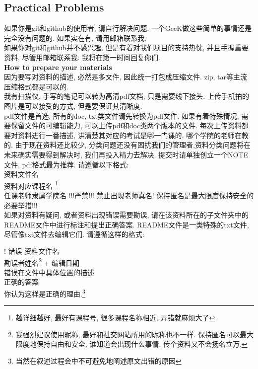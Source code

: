 \documentclass{article}
\begin{document}
\begin{spacing}{1.5}
\subsection{Practical Problems}
如果你是git和github的使用者, 请自行解决问题. 一个GeeK做这些简单的事情还是完全没有问题的. 如果实在有, 请用邮箱联系我.\\
如果你对git和github并不感兴趣, 但是有着对我们项目的支持热忱, 并且手握重要资料, 尽管用邮箱联系我. 我将在第一时间回复你们. \\
\textbf{How to prepare your materials} \\
因为要写对资料的描述, 必然是多文件, 因此统一打包成压缩文件. zip, tar等主流压缩格式都是可以的. \\
我有扫描仪, 手写的笔记可以转为高清pdf文档, 只是需要线下接头. 上传手机拍的图片是可以接受的方式, 但是要保证其清晰度.\\
pdf文件是首选, 所有的doc, txt类文件请先转换为pdf文件. 如果有着特殊情况, 需要保留文件的可编辑能力, 可以上传pdf和doc类两个版本的文件. 每次上传资料都要对资料进行一番描述, 讲清楚其对应的考试是哪一门课的, 哪个学院的老师在教的. 由于现在资料还比较少, 分类问题还没有困扰我们的管理者,资料分类问题将在未来确实需要得到解决时, 我们再投入精力去解决. 提交时请单独创立一个NOTE文件, pdf格式最为推荐. 请遵循以下格式: \\

\noindent 资料文件名 \\
 资料对应课程名 \footnote[1]{越详细越好, 最好有课程号, 很多课程名称相近, 弄错就麻烦大了} \\
 任课老师隶属学院名 !!!严禁!!! 禁止出现老师真名! 保持匿名是最大限度保持安全的必要举措!!! \\



如果对资料有疑问, 或者资料出现错误需要勘误, 请在该资料所在的子文件夹中的README文件中进行标注和提出正确答案. README文件是一类特殊的txt文件, 尽管像txt文件去编辑它们. 请遵循这样的格式:\\

\end{spacing}
\noindent! 错误 资料文件名  \\
 勘误者姓名\footnote[2]{我强烈建议使用昵称, 最好和社交网站所用的昵称也不一样. 保持匿名可以最大限度地保持自由和安全, 谁知道会出现什么事情. 传个资料又不会扬名立万.} + 编辑日期  \\
 错误在文件中具体位置的描述  \\
 正确的答案  \\
 你认为这样是正确的理由.\footnote[3]{当然在叙述过程会中不可避免地阐述原文出错的原因} \\
\end{document}
